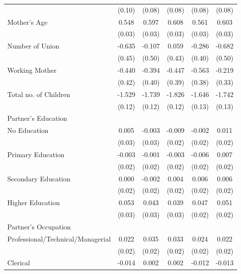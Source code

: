\begin{longtable}{l*{5}{c}}
                    & (0.10) & (0.08) & (0.08) & (0.08) & (0.08) \\
Mother's Age & 0.548\sym{***} & 0.597\sym{***} & 0.608\sym{***} & 0.561\sym{***} & 0.603\sym{***} \\
                    & (0.03) & (0.03) & (0.03) & (0.03) & (0.03) \\
Number of Union & -0.635 & -0.107 & 0.059 & -0.286 & -0.682 \\
                    & (0.45) & (0.50) & (0.43) & (0.40) & (0.50) \\
Working Mother & -0.440 & -0.394 & -0.447 & -0.563 & -0.219 \\
                    & (0.42) & (0.40) & (0.39) & (0.38) & (0.33) \\
Total no. of Children & -1.529\sym{***} & -1.739\sym{***} & -1.826\sym{***} & -1.646\sym{***} & -1.742\sym{***} \\
                    & (0.12) & (0.12) & (0.12) & (0.13) & (0.13) \\
\multicolumn{6}{l}{Partner's Education} \\
\hspace{1em}No Education & 0.005 & -0.003 & -0.009 & -0.002 & 0.011 \\
                    & (0.03) & (0.03) & (0.02) & (0.02) & (0.02) \\
\hspace{1em}Primary Education & -0.003 & -0.001 & -0.003 & -0.006 & 0.007 \\
                    & (0.02) & (0.02) & (0.02) & (0.02) & (0.02) \\
\hspace{1em}Secondary Education & 0.000 & -0.002 & 0.004 & 0.006 & 0.006 \\
                    & (0.02) & (0.02) & (0.02) & (0.02) & (0.02) \\
\hspace{1em}Higher Education & 0.053\sym{**} & 0.043 & 0.039 & 0.047\sym{*} & 0.051\sym{**} \\
                    & (0.03) & (0.03) & (0.03) & (0.02) & (0.02) \\
\multicolumn{6}{l}{Partner's Occupation} \\
\hspace{1em}Professional/Technical/Managerial & 0.022 & 0.035\sym{*} & 0.033\sym{*} & 0.024 & 0.022 \\
                    & (0.02) & (0.02) & (0.02) & (0.02) & (0.02) \\
\hspace{1em}Clerical & -0.014 & 0.002 & 0.002 & -0.012 & -0.013 \\

\end{longtable}
